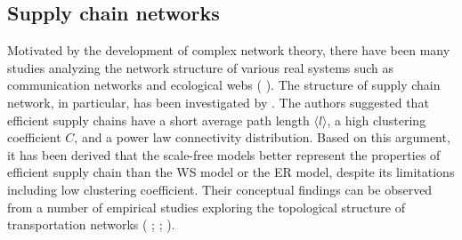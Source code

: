 \subsection{Supply chain networks}
Motivated by the development of complex network theory, there have been many studies analyzing the network structure of various real systems such as communication networks and ecological webs (\citeauthor{albert2002} \cite{albert2002}). The structure of supply chain network, in particular, has been investigated by \citeauthor{hearnshaw2013complex}  \cite{hearnshaw2013complex}. The authors suggested that efficient supply chains have a short average path length $\langle l \rangle$, a high clustering coefficient $C$, and a power law connectivity distribution. Based on this argument, it has been derived that the scale-free models better represent the properties of efficient supply chain than the WS model or the ER model, despite its limitations including low clustering coefficient. Their conceptual findings can be observed from a number of empirical studies exploring the topological structure of transportation networks (\citeauthor{tarapata2015modelling} \cite{tarapata2015modelling}; \citeauthor{haznagy2015complex} \cite{haznagy2015complex}; \citeauthor{de2019public} \cite{de2019public}).